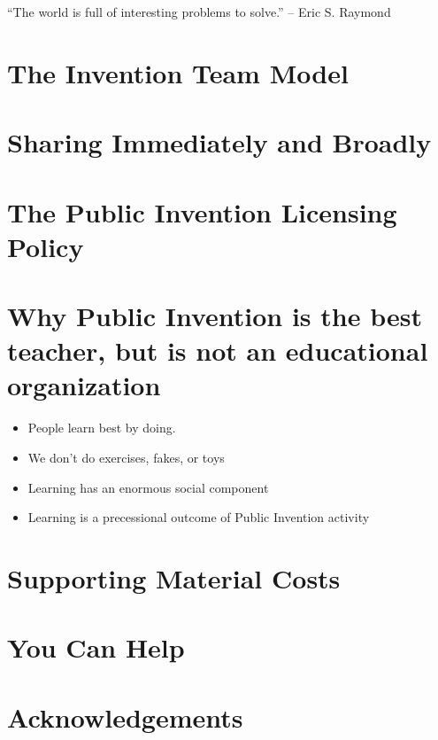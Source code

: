 \documentclass[
	fontsize=10pt, %
	twoside=false, %
	secnumdepth=1, %
]{kaobook}
\begin{document}
``The world is full of interesting problems to solve.'' -- Eric S. Raymond


\chapter{The Invention Team Model}

\chapter{Sharing Immediately and Broadly}

\chapter{The Public Invention Licensing Policy}

\chapter{Why Public Invention is the best teacher, but is not an educational organization}

\begin{itemize}
\item People learn best by doing.
\item We don’t do exercises, fakes, or toys
\item Learning has an enormous social component
\item Learning is a precessional outcome of Public Invention activity
\end{itemize}


\chapter{Supporting Material Costs}
\label{chp:material}

\chapter{You Can Help}


\appendix %



\chapter*{Acknowledgements}
\end{document}
